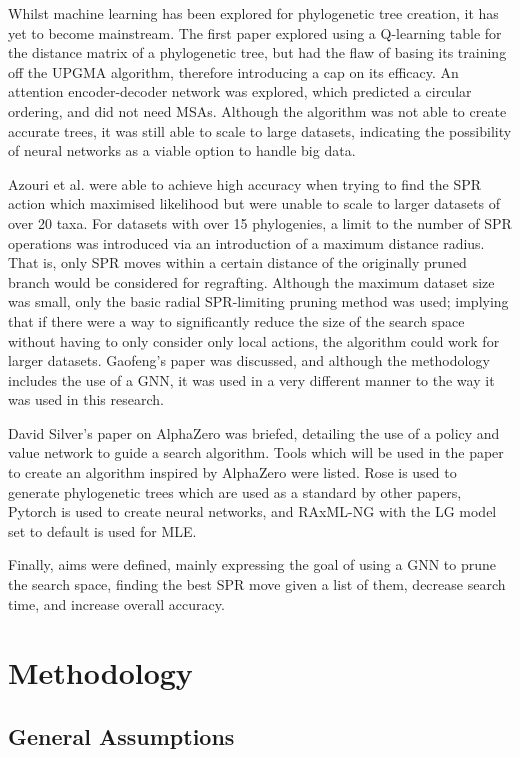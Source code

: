 \documentclass{mpaper}
\begin{document}
Whilst machine learning has been explored for phylogenetic tree creation, it has yet to become mainstream. The first paper explored using a Q-learning table for the distance matrix of a phylogenetic tree, but had the flaw of basing its training off the UPGMA algorithm, therefore introducing a cap on its efficacy. An attention encoder-decoder network was explored, which predicted a circular ordering, and did not need MSAs. Although the algorithm was not able to create accurate trees, it was still able to scale to large datasets, indicating the possibility of neural networks as a viable option to handle big data. 

Azouri et al. were able to achieve high accuracy when trying to find the SPR action which maximised likelihood but were unable to scale to larger datasets of over 20 taxa. For datasets with over 15 phylogenies, a limit to the number of SPR operations was introduced via an introduction of a maximum distance radius. That is, only SPR moves within a certain distance of the originally pruned branch would be considered for regrafting. Although the maximum dataset size was small, only the basic radial SPR-limiting pruning method was used; implying that if there were a way to significantly reduce the size of the search space without having to only consider only local actions, the algorithm could work for larger datasets. Gaofeng's paper was discussed, and although the methodology includes the use of a GNN, it was used in a very different manner to the way it was used in this research.

David Silver's paper on AlphaZero was briefed, detailing the use of a policy and value network to guide a search algorithm. Tools which will be used in the paper to create an algorithm inspired by AlphaZero were listed. Rose is used to generate phylogenetic trees which are used as a standard by other papers, Pytorch is used to create neural networks, and RAxML-NG with the LG model set to default is used for MLE.

Finally, aims were defined, mainly expressing the goal of using a GNN to prune the search space, finding the best SPR move given a list of them, decrease search time, and increase overall accuracy.

\section{Methodology}

\subsection{General Assumptions}
\end{document}
